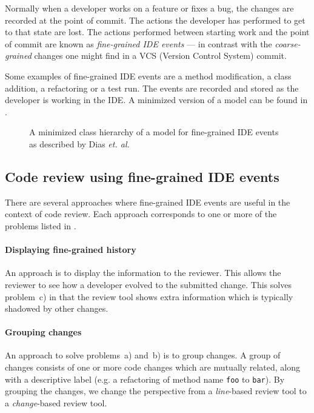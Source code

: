 \documentclass[conference,a4paper]{IEEEtran}
\newcommand{\code}[1]{\texttt{#1}}
\begin{document}
Normally when a developer works on a feature or fixes a bug, the
changes are recorded at the point of commit. The actions the developer
has performed to get to that state are lost. The actions performed
between starting work and the point of commit are known as
\textit{fine-grained IDE events} --- in contrast with the
\textit{coarse-grained} changes one might find in a VCS (Version
Control System) commit.

Some examples of fine-grained IDE events are a method modification, a
class addition, a refactoring or a test run. The events are recorded
and stored as the developer is working in the IDE. A minimized version
of a model can be found in .
\begin{figure}[h]
  \centering
  \resizebox{!}{0.3\textheight}{%
    
  }
  \caption{A minimized class hierarchy of a model for fine-grained IDE
    events as described by Dias \textit{et. al.}~\cite{Dias15a}}
  \label{fig:ide-event-class-model}
\end{figure}

\subsection{Code review using fine-grained IDE events}
\label{sec:code-review-using-1}

There are several approaches where fine-grained IDE events are useful
in the context of code review. Each approach corresponds to one or
more of the problems listed in .

\paragraph{Displaying fine-grained history}

An approach is to display the information to the reviewer. This allows
the reviewer to see how a developer evolved to the submitted
change. This solves problem~c) in that the review tool shows extra
information which is typically shadowed by other changes.

\paragraph{Grouping changes}

An approach to solve problems~a) and~b) is to group changes. A group
of changes consists of one or more code changes which are mutually
related, along with a descriptive label (e.g. a refactoring of method
name \code{foo} to \code{bar}). By grouping the changes, we change the
perspective from a \textit{line}-based review tool to a
\textit{change}-based review tool.
\end{document}
